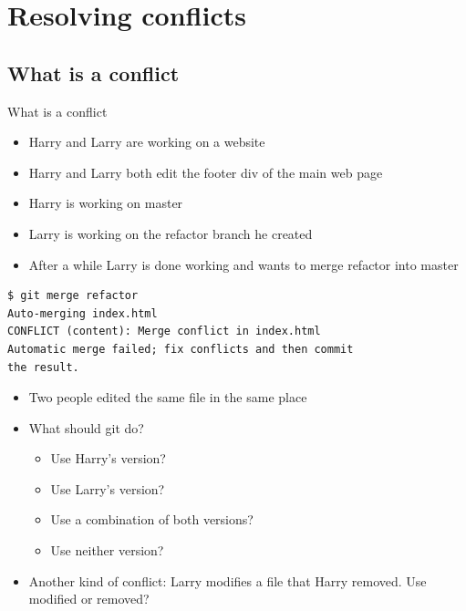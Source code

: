 \documentclass[10pt,a4paper]{beamer}
\begin{document}
\section{Resolving conflicts}

\subsection{What is a conflict}
\begin{frame}{What is a conflict}
\begin{itemize}
	\item Harry and Larry are working on a website
	\item Harry and Larry both edit the footer div of the main web page
	\item Harry is working on master
	\item Larry is working on the refactor branch he created
	\item After a while Larry is done working and wants to merge refactor into master
\end{itemize}
\end{frame}

\begin{frame}[fragile]
\begin{verbatim}
$ git merge refactor
Auto-merging index.html
CONFLICT (content): Merge conflict in index.html
Automatic merge failed; fix conflicts and then commit
the result.
\end{verbatim}
\begin{itemize}
	\item Two people edited the same file in the same place
	\item What should git do?
	\begin{itemize}
	\item Use Harry's version?
	\item Use Larry's version?
	\item Use a combination of both versions?
	\item Use neither version?
	\end{itemize}

	\item Another kind of conflict: Larry modifies a file that Harry removed. Use modified or removed?
\end{itemize}
\end{frame}
\end{document}
